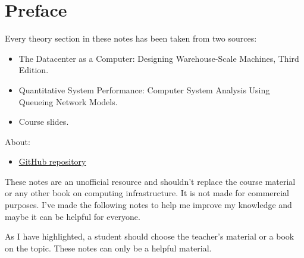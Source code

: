 \section*{Preface}

Every theory section in these notes has been taken from two sources:
\begin{itemize}
    \item The Datacenter as a Computer: Designing Warehouse-Scale Machines, Third Edition.\cite{barroso2022datacenter}

    \item Quantitative System Performance: Computer System Analysis Using Queueing Network Models.\cite{lazowska1984quantitative}
    
    \item Course slides.\cite{computing-infrastructures-polimi}
\end{itemize}
About:
\begin{itemize}
    \item[\faIcon{github}] \href{https://github.com/PoliMI-HPC-E-notes-projects-AndreVale69/HPC-E-PoliMI-university-notes}{GitHub repository}
\end{itemize}
These notes are an unofficial resource and shouldn't replace the course material or any other book on computing infrastructure. It is not made for commercial purposes. I've made the following notes to help me improve my knowledge and maybe it can be helpful for everyone.

As I have highlighted, a student should choose the teacher's material or a book on the topic. These notes can only be a helpful material.